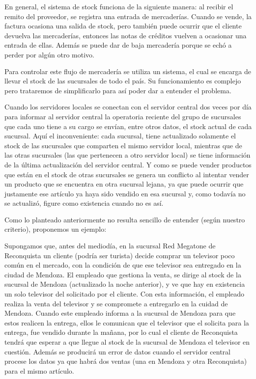 En general, el sistema de stock funciona de la siguiente manera: al recibir el
remito del proveedor, se registra una entrada de mercaderías. Cuando se vende,
la factura ocasiona una salida de stock, pero también puede ocurrir que el
cliente devuelva las mercaderías, entonces las notas de créditos vuelven a
ocasionar una entrada de ellas. Además se puede dar de baja mercadería porque
se echó a perder por algún otro motivo.

Para controlar este flujo de mercadería se utiliza un sistema, el cual se
encarga de llevar el stock de las sucursales de todo el país. Su funcionamiento
es complejo pero trataremos de simplificarlo para así poder dar a entender el
problema. 

Cuando los servidores locales se conectan con el servidor central dos veces por
día para informar al servidor central la operatoria reciente del grupo de
sucursales que cada uno tiene a su cargo se envían, entre otros datos, el stock
actual de cada sucursal. Aquí el inconveniente: cada sucursal, tiene
actualizado solamente el stock de las sucursales que comparten el mismo
servidor local, mientras que de las otras sucursales (las que pertenecen a otro
servidor local) se tiene información de la última actualización del servidor
central. Y como se puede vender productos que están en el stock de otras
sucursales se genera un conflicto al intentar vender un producto que se
encuentra en otra sucursal lejana, ya que puede ocurrir que justamente ese
artículo ya haya sido vendido en esa sucursal y, como todavía no se actualizó,
figure como existencia cuando no es así.

Como lo planteado anteriormente no resulta sencillo de entender (según nuestro
criterio), proponemos un ejemplo:

Supongamos que, antes del mediodía, en la sucursal Red Megatone de Reconquista
un cliente (podría ser turista) decide comprar un televisor poco común en el
mercado, con la condición de que ese televisor sea entregado en la ciudad de
Mendoza. El empleado que gestiona la venta, se dirige al stock de la sucursal
de Mendoza (actualizado la noche anterior), y ve que hay en existencia un solo
televisor del solicitado por el cliente. Con esta información, el empleado
realiza la venta del televisor y se compromete a entregarlo en la cuidad de
Mendoza. Cuando este empleado informa a la sucursal de Mendoza para que estos
realicen la entrega, ellos le comunican que el televisor que el solicita para
la entrega, fue vendido durante la mañana, por lo cual el cliente de
Reconquista tendrá que esperar a que llegue al stock de la sucursal de Mendoza
el televisor en cuestión. Además se producirá un error de datos cuando el
servidor central procese los datos ya que habrá dos ventas (una en Mendoza y
otra Reconquista) para el mismo artículo.


